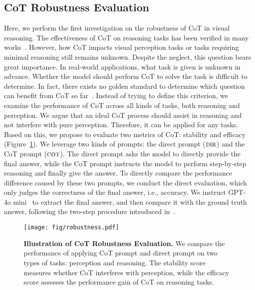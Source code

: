 \subsection{CoT Robustness Evaluation}
\label{sec2_evaluation_robustness}
Here, we perform the first investigation on the robustness of CoT in visual reasoning. The effectiveness of CoT on reasoning tasks has been verified in many works~\cite{wei2022chain, o1}. However, how CoT impacts visual perception tasks or tasks requiring minimal reasoning still remains unknown. Despite the neglect, this question bears great importance.
In real-world applications, what task is given is unknown in advance. Whether the model should perform CoT to solve the task is difficult to determine. In fact, there exists no golden standard to determine which question can benefit from CoT so far~\cite{sprague2024cot}.
Instead of trying to define this criterion, we examine the performance of CoT across all kinds of tasks, both reasoning and perception. We argue that an ideal CoT process should assist in reasoning and not interfere with pure perception. Therefore, it can be applied for any tasks.
Based on this, we propose to evaluate two metrics of CoT: stability and efficacy (Figure~\ref{fig:robustness}). We leverage two kinds of prompts: the direct prompt ($\textsc{dir}$) and the CoT prompt ($\textsc{cot}$). The direct prompt asks the model to directly provide the final answer, while the CoT prompt instructs the model to perform step-by-step reasoning and finally give the answer. To directly compare the performance difference caused by these two prompts, we conduct the direct evaluation, which only judges the correctness of the final answer, i.e., accuracy. We instruct GPT-4o mini~\cite{gpt4omini} to extract the final answer, and then compare it with the ground truth answer, following the two-step procedure introduced in~\cite{zhang2024mathverse}. 

\begin{figure}[t]
\begin{center}
\centerline{\texttt{[image: fig/robustness.pdf]}}
\caption{\textbf{Illustration of CoT Robustness Evaluation.} We compare the performance of applying CoT prompt and direct prompt on two types of tasks: perception and reasoning. The stability score measures whether CoT interferes with perception, while the efficacy score assesses the performance gain of CoT on reasoning tasks.}
\label{fig:robustness}
\end{center}
\vskip -0.2in
\end{figure}

